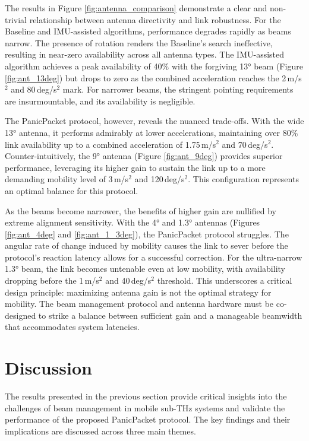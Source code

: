 \documentclass[fleqn,10pt]{wlscirep}
\begin{document}
The results in Figure \ref{fig:antenna_comparison} demonstrate a clear and non-trivial relationship between antenna directivity and link robustness. For the Baseline and IMU-assisted algorithms, performance degrades rapidly as beams narrow. The presence of rotation renders the Baseline's search ineffective, resulting in near-zero availability across all antenna types. The IMU-assisted algorithm achieves a peak availability of 40\% with the forgiving 13° beam (Figure \ref{fig:ant_13deg}) but drops to zero as the combined acceleration reaches the 2\,m/s$^2$ and 80\,deg/s$^2$ mark. For narrower beams, the stringent pointing requirements are insurmountable, and its availability is negligible.

The PanicPacket protocol, however, reveals the nuanced trade-offs. With the wide 13° antenna, it performs admirably at lower accelerations, maintaining over 80\% link availability up to a combined acceleration of 1.75\,m/s$^2$ and 70\,deg/s$^2$. Counter-intuitively, the 9° antenna (Figure \ref{fig:ant_9deg}) provides superior performance, leveraging its higher gain to sustain the link up to a more demanding mobility level of 3\,m/s$^2$ and 120\,deg/s$^2$. This configuration represents an optimal balance for this protocol.

As the beams become narrower, the benefits of higher gain are nullified by extreme alignment sensitivity. With the 4° and 1.3° antennas (Figures \ref{fig:ant_4deg} and \ref{fig:ant_1_3deg}), the PanicPacket protocol struggles. The angular rate of change induced by mobility causes the link to sever before the protocol's reaction latency allows for a successful correction. For the ultra-narrow 1.3° beam, the link becomes untenable even at low mobility, with availability dropping before the 1\,m/s$^2$ and 40\,deg/s$^2$ threshold. This underscores a critical design principle: maximizing antenna gain is not the optimal strategy for mobility. The beam management protocol and antenna hardware must be co-designed to strike a balance between sufficient gain and a manageable beamwidth that accommodates system latencies.
\section*{Discussion}

The results presented in the previous section provide critical insights into the challenges of beam management in mobile sub-THz systems and validate the performance of the proposed PanicPacket protocol. The key findings and their implications are discussed across three main themes.
\end{document}
